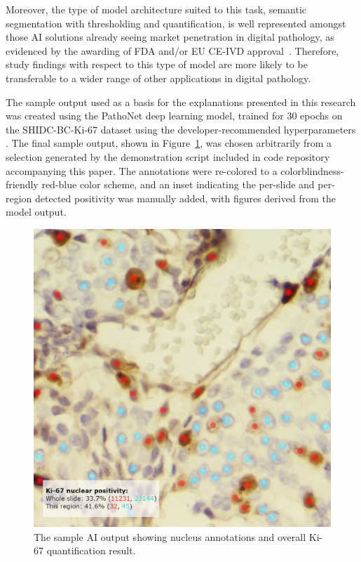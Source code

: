 Moreover, the type of model architecture suited to this task, semantic segmentation with thresholding and quantification, is well represented amongst those AI solutions already seeing market penetration in digital pathology, as evidenced by the awarding of FDA and/or EU CE-IVD approval~\cite{garcia2019new}. Therefore, study findings with respect to this type of model are more likely to be transferable to a wider range of other applications in digital pathology.

The sample output used as a basis for the explanations presented in this research was created using the PathoNet deep learning model, trained for 30 epochs on the SHIDC-BC-Ki-67 dataset using the developer-recommended hyperparameters \cite{negahbani2021pathonet}. The final sample output, shown in Figure~\ref{fig:exampleoutput}, was chosen arbitrarily from a selection generated by the demonstration script included in code repository accompanying this paper. The annotations were re-colored to a colorblindness-friendly red-blue color scheme, and an inset indicating the per-slide and per-region detected positivity was manually added, with figures derived from the model output.

\begin{figure}[!ht]
    \centering
    \includegraphics[width=0.85\linewidth]{Graphics/3CaseStudyDesign/base_image.png}
    \caption{The sample AI output showing nucleus annotations and overall Ki-67 quantification result.}
    \label{fig:exampleoutput}
\end{figure}


